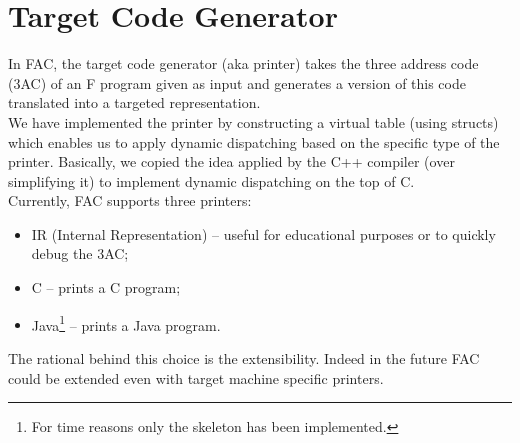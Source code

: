 \section{Target Code Generator}

In FAC, the target code generator (aka printer) takes the
three address code (3AC) of an F program given as input and generates a version
of this code translated into a targeted representation.
\\
We have implemented the printer by constructing a virtual table
(using structs) which enables us to apply dynamic dispatching based on the
specific type of the printer. Basically, we copied the idea applied by the C++
compiler (over simplifying it) to implement dynamic dispatching on the top of C.
\\
Currently, FAC supports three printers:
\begin{itemize}
\item IR (Internal Representation) -- useful for educational purposes or to
quickly debug the 3AC;
\item C -- prints a C program;
\item Java\footnote{For time reasons only the skeleton has been implemented.}
-- prints a Java program.
\end{itemize}

The rational behind this choice is the extensibility. Indeed in the future
FAC could be extended even with target machine specific printers.

